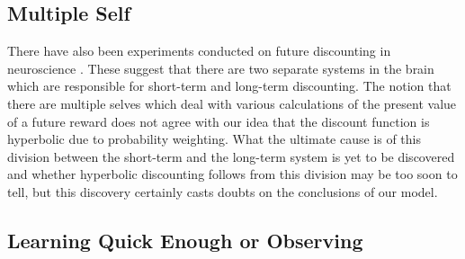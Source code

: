 \documentclass[a4paper,10pt]{article}
\numberwithin{equation}{section}
\begin{document}


\subsection{Multiple Self}
\label{sec:Multiple Self}

There have also been experiments conducted on future discounting in neuroscience \cite{McClure2004}. These suggest that there are two separate systems in the brain which are responsible for short-term and long-term discounting. The notion that there are multiple selves which deal with various calculations of the present value of a future reward does not agree with our idea that the discount function is hyperbolic due to probability weighting. What the ultimate cause is of this division between the short-term and the long-term system is yet to be discovered and whether hyperbolic discounting follows from this division may be too soon to tell, but this discovery certainly casts doubts on the conclusions of our model.


\subsection{Learning Quick Enough or Observing}
\label{sec:Learning Quick Enough or Observing}
\end{document}
